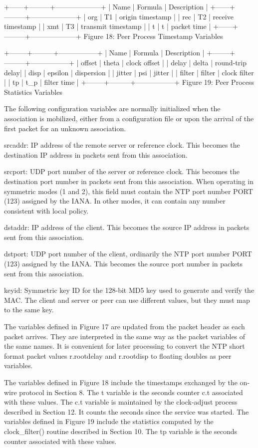 +------+---------+--------------------+
| Name | Formula | Description |
+------+---------+--------------------+
| org | T1 | origin timestamp |
| rec | T2 | receive timestamp |
| xmt | T3 | transmit timestamp |
| t | t | packet time |
+------+---------+--------------------+
Figure 18: Peer Process Timestamp Variables

+--------+---------+-----------------+
| Name | Formula | Description |
+--------+---------+-----------------+
| offset | theta | clock offset |
| delay | delta | round-trip delay|
| disp | epsilon | dispersion |
| jitter | psi | jitter |
| filter | filter | clock filter |
| tp | t_p | filter time |
+--------+---------+-----------------+
Figure 19: Peer Process Statistics Variables

The following configuration variables are normally initialized when
the association is mobilized, either from a configuration file or
upon the arrival of the first packet for an unknown association.

srcaddr: IP address of the remote server or reference clock. This
becomes the destination IP address in packets sent from this
association.

srcport: UDP port number of the server or reference clock. This
becomes the destination port number in packets sent from this
association. When operating in symmetric modes (1 and 2), this field
must contain the NTP port number PORT (123) assigned by the IANA. In
other modes, it can contain any number consistent with local policy.

dstaddr: IP address of the client. This becomes the source IP
address in packets sent from this association.

dstport: UDP port number of the client, ordinarily the NTP port
number PORT (123) assigned by the IANA. This becomes the source port
number in packets sent from this association.

keyid: Symmetric key ID for the 128-bit MD5 key used to generate and
verify the MAC. The client and server or peer can use different
values, but they must map to the same key.

The variables defined in Figure 17 are updated from the packet header
as each packet arrives. They are interpreted in the same way as the
packet variables of the same names. It is convenient for later
processing to convert the NTP short format packet values r.rootdelay
and r.rootdisp to floating doubles as peer variables.

The variables defined in Figure 18 include the timestamps exchanged
by the on-wire protocol in Section 8. The t variable is the seconds
counter c.t associated with these values. The c.t variable is
maintained by the clock-adjust process described in Section 12. It
counts the seconds since the service was started. The variables
defined in Figure 19 include the statistics computed by the
clock_filter() routine described in Section 10. The tp variable is
the seconds counter associated with these values.

